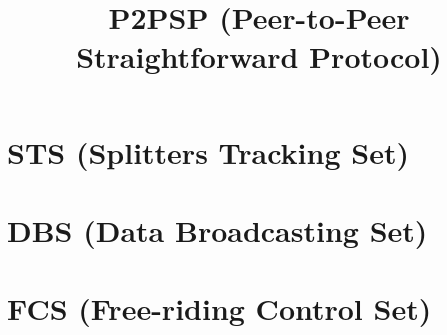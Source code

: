 

\newenvironment{notex}
               {\textbf{Note}:
               }
               {
               }

\title{P2PSP (Peer-to-Peer Straightforward Protocol)}
\maketitle

\begin{abstract}

\end{abstract}

\tableofcontents

\section{STS (Splitters Tracking Set)}


\section{DBS (Data Broadcasting Set)}


\section{FCS (Free-riding Control Set)}


